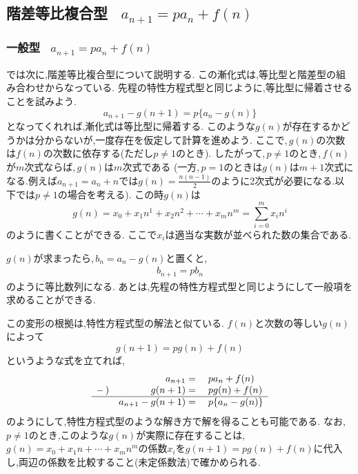 
\subsection{階差等比複合型 \, $\displaystyle a_{n+1}=pa_n+f(n)$}
  \subsubsection{一般型 \, $\displaystyle a_{n+1}=pa_n+f(n)$}
    では次に,階差等比複合型について説明する.
    この漸化式は,等比型と階差型の組み合わせからなっている.
    先程の特性方程式型と同じように,等比型に帰着させることを試みよう.
    \[
      a_{n+1}-g(n+1)=p\{a_n-g(n)\}
    \]
    となってくれれば,漸化式は等比型に帰着する.
    このような$g(n)$が存在するかどうかは分からないが,一度存在を仮定して計算を進めよう.
    ここで,\,$g(n)$の次数は$f(n)$の次数に依存する(ただし$p\ne1$のとき).
    したがって,\,$p\ne1$のとき,\,$f(n)$が$m$次式ならば,\,$g(n)$は$m$次式である
    (一方,\,$p=1$のときは$g(n)$は$m+1$次式になる.例えば$a_{n+1}=a_n+n$では$g(n)=\frac{n(n-1)}2$のように2次式が必要になる.以下では$p\ne1$の場合を考える).
    この時$g(n)$は
    \[
      g(n) = x_0 + x_1 n^1 + x_2 n^2  + \cdots +x_{m} n^m =\sum_{i=0}^{m} x_i n^{i}
    \]
    のように書くことができる.
    ここで$x_i$は適当な実数が並べられた数の集合である.

    $g(n)$が求まったら,\,$b_n=a_n-g(n)$と置くと,
    \begin{align*}
      b_{n+1}=pb_n
    \end{align*}
    のように等比数列になる.
    あとは,先程の特性方程式型と同じようにして一般項を求めることができる.

    この変形の根拠は,特性方程式型の解法と似ている.
    $f(n)$と次数の等しい$g(n)$によって
    \[
      g(n+1)=pg(n)+f(n)
    \]
    というような式を立てれば,
    \[
      \begin{array}{rrl}
        & a_{n+1}={} & pa_n+f(n)\\
        -\,) & g(n+1)={} & pg(n)+f(n)\\ \hline
        & a_{n+1}-g(n+1)={} & p\{a_n-g(n)\}
      \end{array}
    \]
    のようにして,特性方程式型のような解き方で解を得ることも可能である.
    なお,\,$p\ne1$のとき,このような$g(n)$が実際に存在することは,\,$g(n)=x_0+x_1n+\cdots+x_mn^m$の係数$x_i$を$g(n+1)=pg(n)+f(n)$に代入し,両辺の係数を比較すること(未定係数法)で確かめられる.
